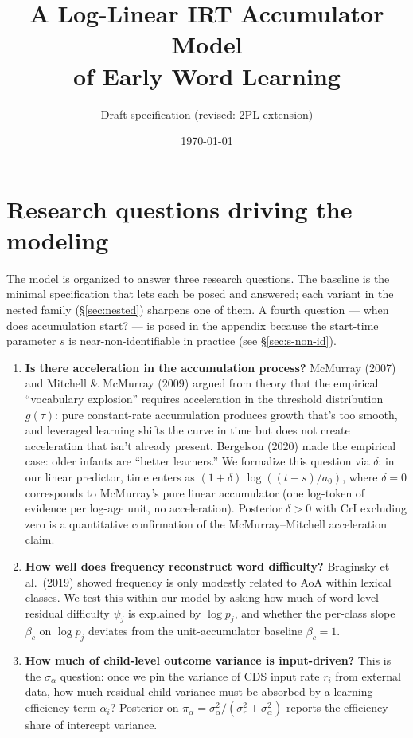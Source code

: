 \documentclass[11pt]{article}
\title{A Log-Linear IRT Accumulator Model\\ of Early Word Learning}
\author{Draft specification (revised: 2PL extension)}
\date{\today}
\begin{document}
\maketitle

\section{Research questions driving the modeling}

The model is organized to answer three research questions. The baseline
is the minimal specification that lets each be posed and answered;
each variant in the nested family (§\ref{sec:nested}) sharpens one of
them. A fourth question — when does accumulation start? — is posed in
the appendix because the start-time parameter \(s\) is
near-non-identifiable in practice (see §\ref{sec:s-non-id}).

\begin{enumerate}[leftmargin=1.3em, label=\textbf{RQ\arabic*.}]
\item \textbf{Is there acceleration in the accumulation process?}
  McMurray (2007) and Mitchell \& McMurray (2009) argued from theory
  that the empirical ``vocabulary explosion'' requires acceleration in
  the threshold distribution \(g(\tau)\): pure constant-rate
  accumulation produces growth that's too smooth, and leveraged
  learning shifts the curve in time but does not create acceleration
  that isn't already present. Bergelson (2020) made the empirical
  case: older infants are ``better learners.'' We formalize this
  question via \(\delta\): in our linear predictor, time enters as
  \((1 + \delta)\,\log\!((t-s)/a_0)\), where \(\delta = 0\)
  corresponds to McMurray's pure linear accumulator (one log-token of
  evidence per log-age unit, no acceleration). Posterior \(\delta > 0\)
  with CrI excluding zero is a quantitative confirmation of the
  McMurray–Mitchell acceleration claim.

\item \textbf{How well does frequency reconstruct word difficulty?}
  Braginsky et al.\ (2019) showed frequency is only modestly related
  to AoA within lexical classes. We test this within our model by
  asking how much of word-level residual difficulty \(\psi_j\) is
  explained by \(\log p_j\), and whether the per-class slope
  \(\beta_c\) on \(\log p_j\) deviates from the unit-accumulator
  baseline \(\beta_c = 1\).

\item \textbf{How much of child-level outcome variance is input-driven?}
  This is the \(\sigma_\alpha\) question: once we pin the variance of
  CDS input rate \(r_i\) from external data, how much residual child
  variance must be absorbed by a learning-efficiency term
  \(\alpha_i\)? Posterior on
  \(\pi_\alpha = \sigma_\alpha^2 / (\sigma_r^2 + \sigma_\alpha^2)\)
  reports the efficiency share of intercept variance.
\end{enumerate}
\end{document}
